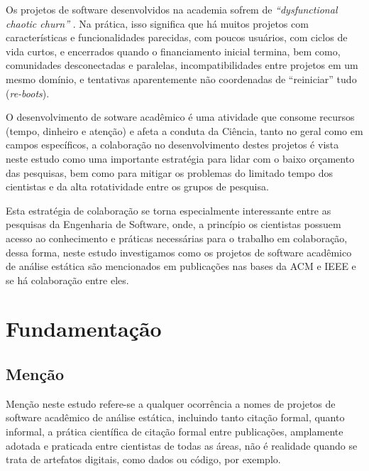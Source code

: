 
Os projetos de software desenvolvidos na academia sofrem de {\it
``dysfunctional chaotic churn''} \cite{howison2015understanding}.
Na prática, isso significa que há muitos projetos com características e
funcionalidades parecidas, com poucos usuários, com ciclos de vida curtos, e
encerrados quando o financiamento inicial termina, bem como, comunidades
desconectadas e paralelas, incompatibilidades entre projetos em um mesmo
domínio, e tentativas aparentemente não coordenadas de ``reiniciar'' tudo ({\it re-boots}). 

O desenvolvimento de sotware acadêmico é uma atividade que consome recursos
(tempo, dinheiro e atenção) e afeta a conduta da Ciência, tanto no geral como
em campos específicos, a colaboração no desenvolvimento destes projetos é vista
neste estudo como uma importante estratégia para lidar com o baixo orçamento
das pesquisas, bem como para mitigar os problemas do limitado tempo dos
cientistas e da alta rotatividade entre os grupos de pesquisa.

Esta estratégia de colaboração se torna especialmente interessante entre as
pesquisas da Engenharia de Software, onde, a princípio os cientistas possuem
acesso ao conhecimento e práticas necessárias para o trabalho em colaboração,
dessa forma, neste estudo investigamos como os projetos de software acadêmico
de análise estática são mencionados em publicações nas bases da ACM e IEEE e se
há colaboração entre eles.


\section{Fundamentação} \label{estudo2:fundamentacao} %

\subsection{Menção}

Menção neste estudo refere-se a qualquer ocorrência a nomes de projetos de
software acadêmico de análise estática, incluindo tanto citação formal, quanto
informal, a prática científica de citação formal entre publicações, amplamente
adotada e praticada entre cientistas de todas as áreas, não é realidade quando
se trata de artefatos digitais, como dados ou código, por exemplo.

